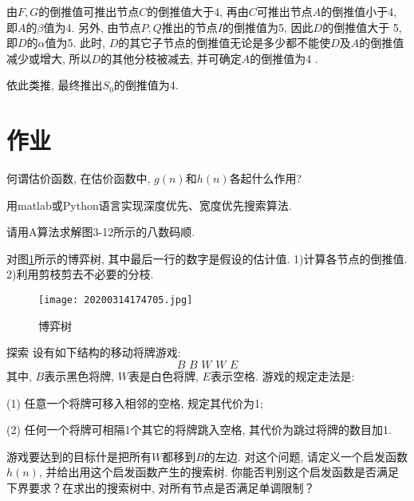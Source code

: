 由$F,G$的倒推值可推出节点$C$的倒推值大于4, 再由$C$可推出节点$A$的倒推值小于4, 即$A$的$\beta$值为4. 另外, 由节点$P,Q$推出的节点$I$的倒推值为5, 因此$D$的倒推值大于 5, 即$D$的$\alpha$值为5.
此时, $D$的其它子节点的倒推值无论是多少都不能使$D$及$A$的倒推值减少或增大, 所以$D$的其他分枝被减去, 并可确定$A$的倒推值为4 .

依此类推, 最终推出$S_0$的倒推值为4.
\section{作业}
\begin{think}
何谓估价函数, 在估价函数中, $g(n)$和$h(n)$各起什么作用?
\end{think}
\begin{think}
  用matlab或Python语言实现深度优先、宽度优先搜索算法.
\end{think}
\begin{think}
 请用A算法求解图3-12所示的八数码顺.
\end{think}

\begin{think}
对图\ref{20200314174705fig51}所示的博弈树, 其中最后一行的数字是假设的估计值. 1)计算各节点的倒推值. 2)利用剪枝剪去不必要的分枝.
\begin{figure}[H]
\centering
\texttt{[image: 20200314174705.jpg]}
\caption{博弈树}
\label{20200314174705fig51}
\end{figure}
\end{think}

\begin{custom}[explorecolor]{探索}
设有如下结构的移动将牌游戏:
$$B\,\,	B\,\,		W\,\,		W\,\,		E$$
其中, $B$表示黑色将牌, $W$表是白色将牌, $E$表示空格. 游戏的规定走法是:

(1) 任意一个将牌可移入相邻的空格, 规定其代价为1;

(2) 任何一个将牌可相隔1个其它的将牌跳入空格, 其代价为跳过将牌的数目加1.

游戏要达到的目标什是把所有$W$都移到$B$的左边. 对这个问题, 请定义一个启发函数$h(n)$, 并给出用这个启发函数产生的搜索树. 你能否判别这个启发函数是否满足下界要求？在求出的搜索树中, 对所有节点是否满足单调限制？
\end{custom}




